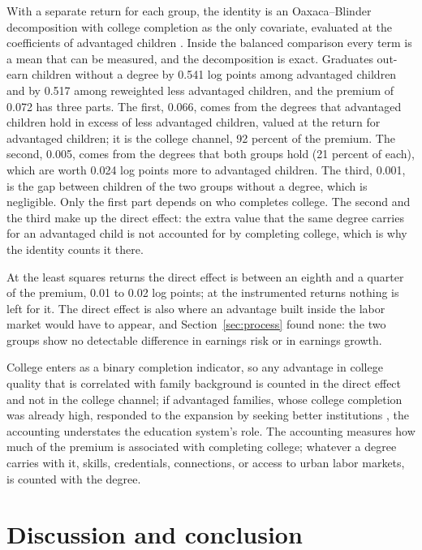\documentclass[11pt]{article}
\begin{document}
With a separate return for each group, the identity is an Oaxaca--Blinder decomposition with college completion as the only covariate, evaluated at the coefficients of advantaged children \citep{Oaxaca1973, Blinder1973}. Inside the balanced comparison every term is a mean that can be measured, and the decomposition is exact. Graduates out-earn children without a degree by 0.541 log points among advantaged children and by 0.517 among reweighted less advantaged children, and the premium of 0.072 has three parts. The first,
0.066, comes from the degrees that advantaged children hold in excess
of less advantaged children, valued at the return for advantaged children;
it is the college channel, 92 percent of the premium. The second, 0.005, comes from the degrees
that both groups hold (21 percent of each), which are worth 0.024 log points
more to advantaged children. The third, 0.001, is the gap between children of the two groups without a degree, which is negligible. Only the first part depends on who completes college. The second and the third make up the direct effect: the extra value that the same degree carries for an advantaged child is not accounted for by completing college, which is why the identity counts it there.

At the least squares returns the direct effect is between an eighth and a quarter of the premium, 0.01 to 0.02 log points; at the instrumented returns nothing is left for it. The direct effect is also where an advantage built inside the labor market would have to appear, and Section~\ref{sec:process} found none: the two groups show no detectable difference in earnings risk or in earnings growth.

College enters as a binary completion
indicator, so any advantage in college quality that is correlated with
family background is counted in the direct effect and not in the
college channel; if advantaged families, whose college completion was
already high, responded to the expansion by seeking better institutions \citep{LiuWan2019, LiuYueZhu2025},
the accounting understates the education system's role. The accounting measures how much of the premium is associated with completing college; whatever a degree carries with it, skills, credentials, connections, or access to urban labor markets, is counted with the degree.

\section{Discussion and conclusion}
\label{sec:conclusion}
\end{document}
